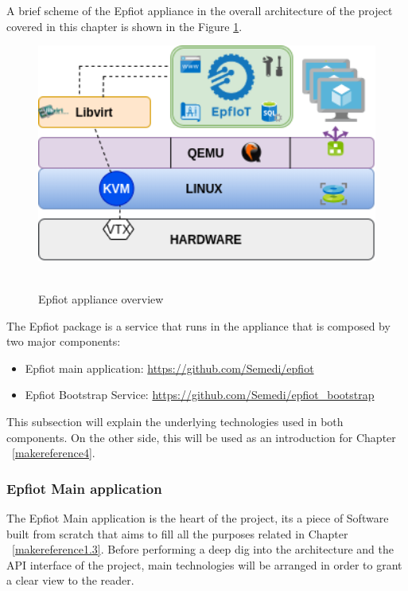 A brief scheme of the Epfiot appliance in the overall architecture of the project covered in this chapter is shown in the Figure \ref{figure3.3}.

\begin{figure}[h!]%
\centering
    \includegraphics[width=5.5in]{figures/Epfiot_appliance.png}
~\caption{Epfiot appliance overview}
\label{figure3.3}
\end{figure}

\newpage
The Epfiot package is a service that runs in the appliance that is composed by two major components:
\begin{itemize}
    \item Epfiot main application: \url{https://github.com/Semedi/epfiot}
    \item Epfiot Bootstrap Service: \url{https://github.com/Semedi/epfiot_bootstrap}
\end{itemize}

This subsection will explain the underlying technologies used in both components. On the other side, this will be used as an introduction for Chapter ~\ref{makereference4}. 

\subsubsection{Epfiot Main application}

The Epfiot Main application is the heart of the project, its a piece of Software built from scratch that aims to fill all the purposes related in Chapter ~\ref{makereference1.3}. Before performing a deep dig into the architecture and the API interface of the project, main technologies will be arranged in order to grant a clear view to the reader.

